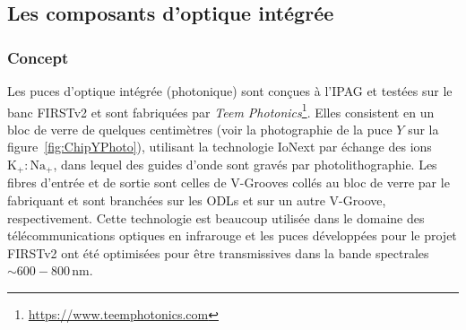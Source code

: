 \subsection{Les composants d'optique intégrée}
\label{sec:PhotonicChip}





\subsubsection{Concept}
\label{sec:ChipConcept}

Les puces d'optique intégrée (photonique) sont conçues à l'\ac{IPAG} et testées sur le banc \ac{FIRSTv2} \citep{martin2020, martin2022b, lallement2022} et sont fabriquées par \textit{Teem Photonics}\footnote{\url{https://www.teemphotonics.com}}. Elles consistent en un bloc de verre de quelques centimètres (voir la photographie de la puce $Y$ sur la figure~\ref{fig:ChipYPhoto}), utilisant la technologie IoNext par échange des ions $\text{K}_+ : \text{Na}_+$, dans lequel des guides d'onde sont gravés par photolithographie. Les fibres d'entrée et de sortie sont celles de V-Grooves collés au bloc de verre par le fabriquant et sont branchées sur les \ac{ODL}s et sur un autre V-Groove, respectivement. Cette technologie est beaucoup utilisée dans le domaine des télécommunications optiques en infrarouge et les puces développées pour le projet \ac{FIRSTv2} ont été optimisées pour être transmissives dans la bande spectrales $\sim 600 - 800 \,$nm.

